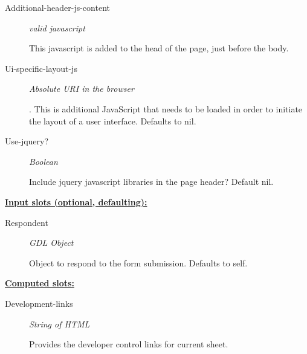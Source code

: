 \documentclass [11pt]{book}
\begin{document}
\begin{itemize}
\begin{description}
\item [Additional-header-js-content]
\emph{valid javascript}

 This javascript is added to the head of the page, just before the body.




\item [Ui-specific-layout-js]
\emph{Absolute URI in the browser}

.
This is additional JavaScript that needs to be loaded in order to initiate the layout of a user
interface. Defaults to nil.




\item [Use-jquery?]
\emph{Boolean}

 Include jquery javascript libraries in the page header?
Default nil.




\end{description}






\textbf{
\underline{Input slots (optional, defaulting):}}

\begin{description}

\item [Respondent]
\emph{GDL Object}

 Object to respond to the form submission. Defaults to self.




\end{description}






\textbf{
\underline{Computed slots:}}

\begin{description}

\item [Development-links]
\emph{String of HTML}

 Provides the developer control links for current sheet.




\end{description}







\end{itemize}
\end{document}
